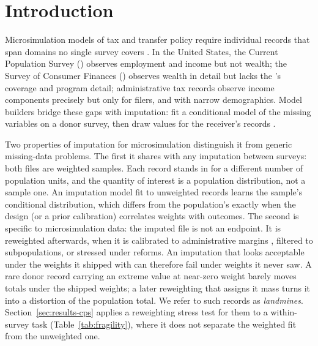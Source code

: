 \section{Introduction}

Microsimulation models of tax and transfer policy require individual records
that span domains no single survey covers
\citep{bourguignon2006microsimulation, sutherland2013euromod}. In the United
States, the Current Population Survey (\cps{}) observes employment and income
but not wealth; the Survey of Consumer Finances (\scf{}) observes wealth in
detail but lacks the \cps{}'s coverage and program detail; administrative tax
records observe income components precisely but only for filers, and with
narrow demographics. Model builders bridge these gaps with imputation: fit a
conditional model of the missing variables on a donor survey, then draw
values for the receiver's records
\citep{little2002statistical, dorazio2006statistical}.

Two properties of imputation for microsimulation distinguish it from generic
missing-data problems. The first it shares with any imputation between
surveys: both files are weighted samples. Each record stands in for a
different number of population units, and the quantity of interest is a
population distribution, not a sample one. An imputation model fit to
unweighted records learns the sample's conditional distribution, which
differs from the population's exactly when the design (or a prior
calibration) correlates weights with outcomes. The second is specific to microsimulation
data: the imputed file is not an endpoint. It is reweighted afterwards, when
it is calibrated to administrative margins
\citep{deville1992calibration, hainmueller2012entropy}, filtered to
subpopulations, or stressed under reforms. An imputation that looks
acceptable under the weights it shipped with can therefore fail under weights
it never saw. A rare donor record carrying an extreme value at near-zero weight
barely moves totals under the shipped weights; a later reweighting that
assigns it mass turns it into a distortion of the population total. We refer to such records
as \emph{landmines}. Section~\ref{sec:results-cps} applies a reweighting
stress test for them to a within-survey task (Table~\ref{tab:fragility}),
where it does not separate the weighted fit from the unweighted one.

